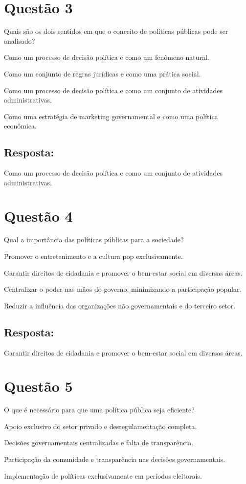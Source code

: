 \documentclass[
   article,       
   12pt,          
   oneside,       
   a4paper,       
   english,       
   brazil,        
   sumario=tradicional
   ]{abntex2}
\begin{document}
\section{Questão 3}
Quais são os dois sentidos em que o conceito de políticas públicas pode ser analisado?
\itemize
    \item Como um processo de decisão política e como um fenômeno natural.
    \item Como um conjunto de regras jurídicas e como uma prática social.
    \item Como um processo de decisão política e como um conjunto de atividades administrativas.
    \item Como uma estratégia de marketing governamental e como uma política econômica.
\subsection{Resposta:} Como um processo de decisão política e como um conjunto de atividades administrativas.
\section{Questão 4}
Qual a importância das políticas públicas para a sociedade?
\itemize
    \item Promover o entretenimento e a cultura pop exclusivamente.
    \item Garantir direitos de cidadania e promover o bem-estar social em diversas áreas.
    \item Centralizar o poder nas mãos do governo, minimizando a participação popular.
    \item Reduzir a influência das organizações não governamentais e do terceiro setor.
\subsection{Resposta:} Garantir direitos de cidadania e promover o bem-estar social em diversas áreas.
\section{Questão 5}
O que é necessário para que uma política pública seja eficiente?
\itemize
    \item Apoio exclusivo do setor privado e desregulamentação completa.
    \item Decisões governamentais centralizadas e falta de transparência.
    \item Participação da comunidade e transparência nas decisões governamentais.
    \item Implementação de políticas exclusivamente em períodos eleitorais.
\end{document}
